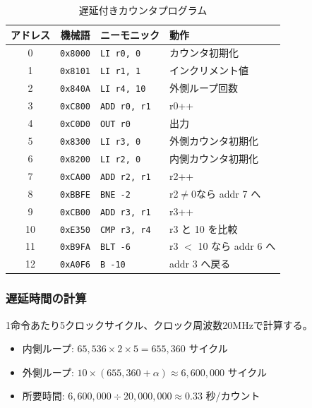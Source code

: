 \documentclass[a4paper,11pt]{ltjsarticle}
\begin{document}
\begin{table}[h]
\centering
\caption{遅延付きカウンタプログラム}
\label{tab:test_counter}
\small
\begin{tabular}{ccll}
\toprule
アドレス & 機械語 & ニーモニック & 動作 \\
\midrule
0  & \texttt{0x8000} & \texttt{LI r0, 0}    & カウンタ初期化 \\
1  & \texttt{0x8101} & \texttt{LI r1, 1}    & インクリメント値 \\
2  & \texttt{0x840A} & \texttt{LI r4, 10}   & 外側ループ回数 \\
3  & \texttt{0xC800} & \texttt{ADD r0, r1}  & r0++ \\
4  & \texttt{0xC0D0} & \texttt{OUT r0}      & 出力 \\
5  & \texttt{0x8300} & \texttt{LI r3, 0}    & 外側カウンタ初期化 \\
6  & \texttt{0x8200} & \texttt{LI r2, 0}    & 内側カウンタ初期化 \\
7  & \texttt{0xCA00} & \texttt{ADD r2, r1}  & r2++ \\
8  & \texttt{0xBBFE} & \texttt{BNE -2}      & r2$\neq$0なら addr 7 へ \\
9  & \texttt{0xCB00} & \texttt{ADD r3, r1}  & r3++ \\
10 & \texttt{0xE350} & \texttt{CMP r3, r4}  & r3 と 10 を比較 \\
11 & \texttt{0xB9FA} & \texttt{BLT -6}      & r3 $<$ 10 なら addr 6 へ \\
12 & \texttt{0xA0F6} & \texttt{B -10}       & addr 3 へ戻る \\
\bottomrule
\end{tabular}
\end{table}

\subsubsection{遅延時間の計算}

1命令あたり5クロックサイクル、クロック周波数20MHzで計算する。

\begin{itemize}
\item 内側ループ: $65{,}536 \times 2 \times 5 = 655{,}360$ サイクル
\item 外側ループ: $10 \times (655{,}360 + \alpha) \approx 6{,}600{,}000$ サイクル
\item 所要時間: $6{,}600{,}000 \div 20{,}000{,}000 \approx 0.33$ 秒/カウント
\end{itemize}
\end{document}

